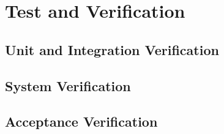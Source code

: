 \chapter{Test and Verification}
\section{Unit and Integration Verification}
\section{System Verification}
\section{Acceptance Verification}